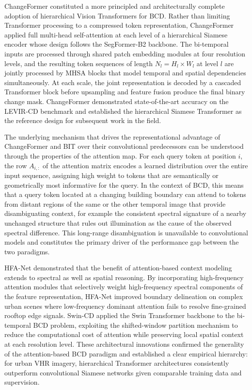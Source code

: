 ChangeFormer \cite{Bandara2022ChangeFormer} constituted a more principled and architecturally complete adoption of hierarchical Vision Transformers for \ac{BCD}. Rather than limiting Transformer processing to a compressed token representation, ChangeFormer applied full multi-head self-attention at each level of a hierarchical Siamese encoder whose design follows the SegFormer-B2 backbone. The bi-temporal inputs are processed through shared patch embedding modules at four resolution levels, and the resulting token sequences of length $N_l = H_l \times W_l$ at level $l$ are jointly processed by \ac{MHSA} blocks that model temporal and spatial dependencies simultaneously. At each scale, the joint representation is decoded by a cascaded Transformer block before upsampling and feature fusion produce the final binary change mask. ChangeFormer demonstrated state-of-the-art accuracy on the LEVIR-CD benchmark and established the hierarchical Siamese Transformer as the reference design for subsequent work in the field.

The underlying mechanism that drives the representational advantage of ChangeFormer and BIT over their convolutional predecessors can be understood through the properties of the attention map. For each query token at position $i$, the row $A_{i,:}$ of the attention matrix encodes a learned distribution over the entire input sequence, assigning high weight to tokens that are semantically or geometrically most informative for the query. In the context of \ac{BCD}, this means that a query token located at a changing building boundary can attend to tokens from distant regions of the same or the other temporal image that provide disambiguating context, for example the consistent spectral signature of a nearby unchanged structure that rules out illumination as the cause of the observed spectral difference. This long-range disambiguation is unavailable to convolutional models and constitutes the primary driver of the performance gap between the two paradigms.

HFA-Net \cite{Zheng2022HFANet} demonstrated that the benefit of attention-based context modeling extends to spectral as well as spatial reasoning. By incorporating high-frequency attention modules that selectively weight high-frequency spectral components of the feature representation, HFA-Net improved boundary delineation on complex urban scenes where low-frequency dominant attention fails to resolve fine-grained rooftop edge signals. Swin-CD \cite{Teng2023SwinCD} applied the Swin Transformer backbone \cite{Liu2021Swin} to the bi-temporal \ac{BCD} problem, exploiting the shifted-window partition mechanism to reduce the computational cost of attention while preserving local spatial context at each resolution level. These architectural innovations confirmed the generality of the attention-based \ac{BCD} paradigm and established a clear empirical hierarchy: for urban \ac{VHR} imagery, hierarchical Transformer architectures consistently outperform convolutional Siamese networks given comparable training data and supervision.

